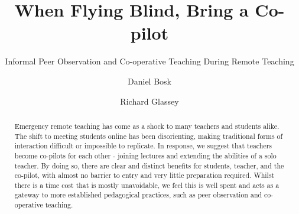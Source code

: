 \documentclass[sigconf,natbib=false]{acmart}
\begin{document}
\title{When Flying Blind, Bring a Co-pilot}
\subtitle{Informal Peer Observation and Co-operative Teaching During Remote Teaching}


\author{Daniel Bosk}
\orcid{}

\author{Richard Glassey}
\orcid{}


\begin{abstract}

Emergency remote teaching has come as a shock to many teachers and students alike. The shift to meeting students online has been disorienting, making traditional forms of interaction difficult or impossible to replicate. In response, we suggest that teachers become co-pilots for each other - joining lectures and extending the abilities of a solo teacher. By doing so, there are clear and distinct benefits for students, teacher, and the co-pilot, with almost no barrier to entry and very little preparation required. Whilst there is a time cost that is mostly unavoidable, we feel this is well spent and acts as a gateway to more established pedagogical practices, such as peer observation and co-operative teaching.

\end{abstract}

\begin{CCSXML}

\end{CCSXML}
\end{document}
